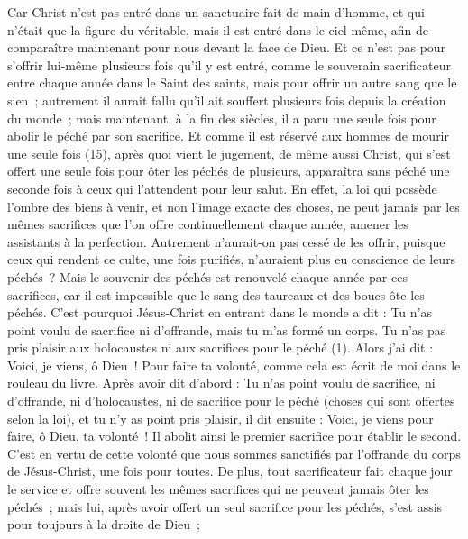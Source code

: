 \begin{multicols}{2}
Car Christ n'est pas entré dans un sanctuaire fait de main d’homme, et qui n’était que la figure du véritable, mais il est entré dans le ciel même, afin de comparaître maintenant pour nous devant la face de Dieu.
Et ce n’est pas pour s’offrir lui-même plusieurs fois qu’il y est entré, comme le souverain sacrificateur entre chaque année dans le Saint des saints, mais pour offrir un autre sang que le sien ;
autrement il aurait fallu qu'il ait souffert plusieurs fois depuis la création du monde ; mais maintenant, à la fin des siècles, il a paru une seule fois pour abolir le péché par son sacrifice.
Et comme il est réservé aux hommes de mourir une seule fois (15), après quoi vient le jugement,
de même aussi Christ, qui s’est offert une seule fois pour ôter les péchés de plusieurs, apparaîtra sans péché une seconde fois à ceux qui l'attendent pour leur salut.
\VerseOne{}En effet, la loi qui possède l'ombre des biens à venir, et non l’image exacte des choses, ne peut jamais par les mêmes sacrifices que l'on offre continuellement chaque année, amener les assistants à la perfection.
Autrement n’aurait-on pas cessé de les offrir, puisque ceux qui rendent ce culte, une fois purifiés, n’auraient plus eu conscience de leurs péchés ?
Mais le souvenir des péchés est renouvelé chaque année par ces sacrifices,
car il est impossible que le sang des taureaux et des boucs ôte les péchés.
C'est pourquoi Jésus-Christ en entrant dans le monde a dit : Tu n'as point voulu de sacrifice ni d'offrande, mais tu m'as formé un corps.
Tu n'as pas pris plaisir aux holocaustes ni aux sacrifices pour le péché (1).
Alors j'ai dit : Voici, je viens, ô Dieu ! Pour faire ta volonté, comme cela est écrit de moi dans le rouleau du livre.
Après avoir dit d’abord : Tu n'as point voulu de sacrifice, ni d'offrande, ni d'holocaustes, ni de sacrifice pour le péché (choses qui sont offertes selon la loi), et tu n'y as point pris plaisir, il dit ensuite : Voici, je viens pour faire, ô Dieu, ta volonté !
Il abolit ainsi le premier sacrifice pour établir le second.
C’est en vertu de cette volonté que nous sommes sanctifiés par l’offrande du corps de Jésus-Christ, une fois pour toutes.
De plus, tout sacrificateur fait chaque jour le service et offre souvent les mêmes sacrifices qui ne peuvent jamais ôter les péchés ;
mais lui, après avoir offert un seul sacrifice pour les péchés, s’est assis pour toujours à la droite de Dieu ;

\end{multicols}
